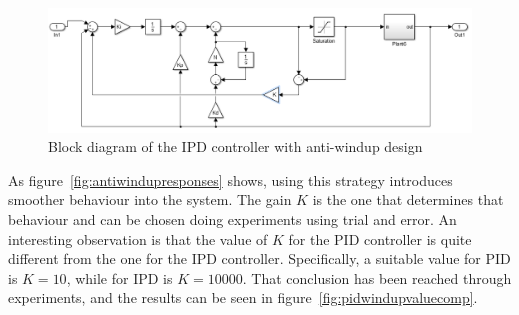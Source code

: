 \begin{figure}[!h]
	\centering
	\includegraphics[width=1\linewidth]{graphics/ipdwindupdesign}
	\caption{Block diagram of the IPD controller with anti-windup design}
	\label{fig:ipdantiwindupstrategy}
\end{figure}

As figure~\ref{fig:antiwindupresponses} shows, using this strategy introduces smoother behaviour into the system. The gain $K$ is the one that determines that behaviour and can be chosen doing experiments using trial and error. An interesting observation is that the value of $K$ for the PID controller is quite different from the one for the IPD controller. Specifically, a suitable value for PID is $K=10$, while for IPD is $K=10000$. That conclusion has been reached through experiments, and the results can be seen in figure~\ref{fig:pidwindupvaluecomp}.

